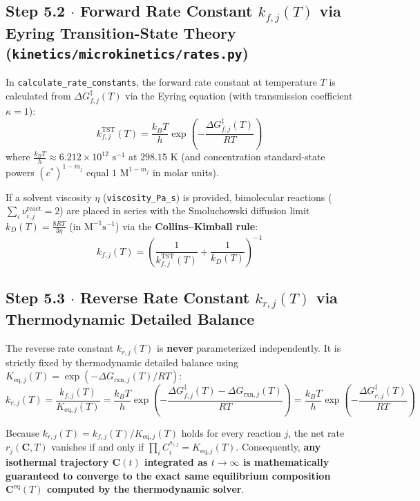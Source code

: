 \documentclass[11pt,a4paper]{article}
\begin{document}
\subsection*{Step 5.2 $\cdot$ Forward Rate Constant $k_{f,j}(T)$ via Eyring Transition-State Theory (\texttt{kinetics/\allowbreak{}microkinetics/\allowbreak{}rates.py})}

In \texttt{calculate\_\allowbreak{}rate\_\allowbreak{}constants}, the forward rate constant at temperature $T$ is calculated from $\Delta G_{f,j}^\ddagger(T)$ via the Eyring equation (with transmission coefficient $\kappa = 1$):
\begin{equation}
k_{f,j}^{\text{TST}}(T) = \frac{k_B T}{h} \exp\!\left(-\frac{\Delta G_{f,j}^\ddagger(T)}{R T}\right)
\end{equation}
where $\frac{k_B T}{h} \approx 6.212 \times 10^{12}\text{ s}^{-1}$ at $298.15\text{ K}$ (and concentration standard-state powers $(c^*)^{1 - m_j}$ equal $1\text{ M}^{1-m_j}$ in molar units).

If a solvent viscosity $\eta$ (\texttt{viscosity\_\allowbreak{}Pa\_\allowbreak{}s}) is provided, bimolecular reactions ($\sum_i \nu_{i,j}^{\text{react}} = 2$) are placed in series with the Smoluchowski diffusion limit $k_D(T) = \frac{8 R T}{3 \eta}$ (in $\text{M}^{-1}\text{s}^{-1}$) via the \textbf{Collins--Kimball rule}:
\begin{equation}
k_{f,j}(T) = \left( \frac{1}{k_{f,j}^{\text{TST}}(T)} + \frac{1}{k_D(T)} \right)^{-1}
\end{equation}

\subsection*{Step 5.3 $\cdot$ Reverse Rate Constant $k_{r,j}(T)$ via Thermodynamic Detailed Balance}

The reverse rate constant $k_{r,j}(T)$ is \textbf{never} parameterized independently. It is strictly fixed by thermodynamic detailed balance using $K_{\text{eq}, j}(T) = \exp(-\Delta G_{\text{rxn}, j}(T) / RT)$:
\begin{equation}
k_{r,j}(T) = \frac{k_{f,j}(T)}{K_{\text{eq}, j}(T)} = \frac{k_B T}{h} \exp\!\left(-\frac{\Delta G_{f,j}^\ddagger(T) - \Delta G_{\text{rxn}, j}(T)}{R T}\right) = \frac{k_B T}{h} \exp\!\left(-\frac{\Delta G_{r,j}^\ddagger(T)}{R T}\right)
\end{equation}

Because $k_{r,j}(T) = k_{f,j}(T) / K_{\text{eq}, j}(T)$ holds for every reaction $j$, the net rate $r_j(\mathbf{C}, T)$ vanishes if and only if $\prod_i C_i^{s_{i,j}} = K_{\text{eq}, j}(T)$. Consequently, \textbf{any isothermal trajectory $\mathbf{C}(t)$ integrated as $t \to \infty$ is mathematically guaranteed to converge to the exact same equilibrium composition $\mathbf{C}^{\text{eq}}(T)$ computed by the thermodynamic solver}.
\end{document}
